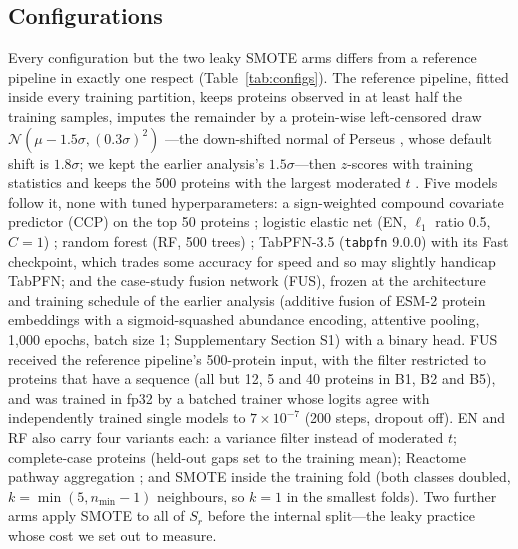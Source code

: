 \documentclass[10pt,letterpaper]{article}
\begin{document}
\subsection{Configurations}
Every configuration but the two leaky SMOTE arms differs from a reference pipeline in exactly one respect
(Table~\ref{tab:configs}). The
reference pipeline, fitted inside every training partition, keeps proteins observed in at least half the
training samples, imputes the remainder by a protein-wise left-censored draw
$\mathcal{N}(\mu - 1.5\sigma, (0.3\sigma)^2)$ \citep{lazar2016missing}---the down-shifted normal of Perseus
\citep{tyanova2016perseus}, whose default shift is $1.8\sigma$; we kept the earlier analysis's
$1.5\sigma$---then $z$-scores with training statistics and keeps the 500 proteins with the largest moderated
$t$ \citep{smyth2004limma}. Five models follow it, none with tuned hyperparameters: a sign-weighted compound
covariate predictor (CCP) on the top 50 proteins \citep{radmacher2002ccp}; logistic elastic net (EN, $\ell_1$ ratio 0.5,
$C = 1$) \citep{zou2005elasticnet}; random forest (RF, 500 trees) \citep{breiman2001rf}; TabPFN-3.5
(\texttt{tabpfn} 9.0.0) \citep{hollmann2025tabpfn,tabpfn2026v35} with its Fast checkpoint, which trades some
accuracy for speed and so may slightly handicap TabPFN; and the case-study fusion network (FUS), frozen at
the architecture and training schedule of the earlier analysis (additive fusion of ESM-2 protein embeddings
with a sigmoid-squashed abundance encoding, attentive pooling, 1,000 epochs, batch size 1; Supplementary
Section S1) with a binary head. FUS received the reference pipeline's 500-protein input, with the filter
restricted to proteins that have a sequence (all but 12, 5 and 40 proteins in B1, B2 and B5), and was trained in fp32 by a batched trainer whose logits agree with
independently trained single models to $7 \times 10^{-7}$ (200 steps, dropout off). EN and RF also carry four
variants each: a variance filter instead of moderated $t$; complete-case proteins (held-out gaps set to the
training mean); Reactome
pathway aggregation \citep{milacic2024reactome}; and SMOTE \citep{chawla2002smote} inside the training fold
(both classes doubled, $k = \min(5, n_{\min} - 1)$ neighbours, so $k = 1$ in the smallest folds). Two further
arms apply SMOTE to all of $S_r$ before the internal split---the leaky practice whose cost we set out to
measure.
\end{document}
